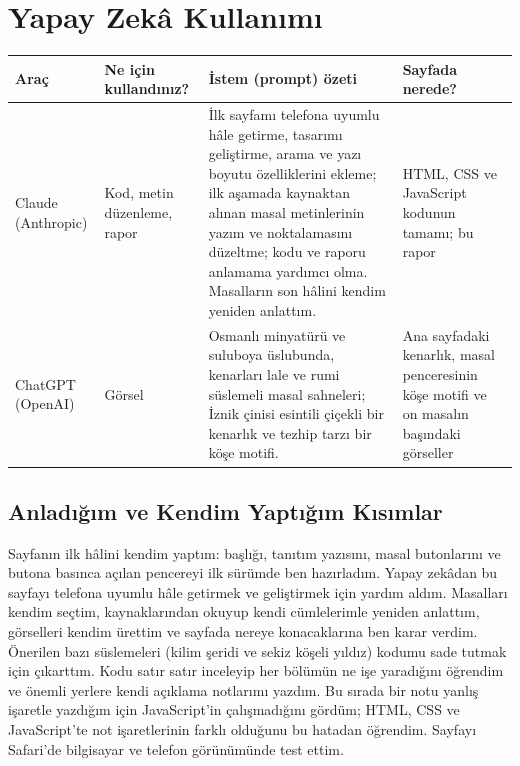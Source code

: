 \documentclass[12pt,a4paper]{article}
\begin{document}
\section{Yapay Zekâ Kullanımı}

\begin{longtable}{@{}p{2.6cm}p{3.6cm}p{4.2cm}p{3.4cm}@{}}
\toprule
\textbf{Araç} & \textbf{Ne için kullandınız?} & \textbf{İstem (prompt) özeti} & \textbf{Sayfada nerede?} \\
\midrule
\endhead
Claude (Anthropic) & Kod, metin düzenleme, rapor & İlk sayfamı telefona uyumlu hâle getirme, tasarımı geliştirme, arama ve yazı boyutu özelliklerini ekleme; ilk aşamada kaynaktan alınan masal metinlerinin yazım ve noktalamasını düzeltme; kodu ve raporu anlamama yardımcı olma. Masalların son hâlini kendim yeniden anlattım. & HTML, CSS ve JavaScript kodunun tamamı; bu rapor \\
\relax ChatGPT (OpenAI) & Görsel & Osmanlı minyatürü ve suluboya üslubunda, kenarları lale ve rumi süslemeli masal sahneleri; İznik çinisi esintili çiçekli bir kenarlık ve tezhip tarzı bir köşe motifi. & Ana sayfadaki kenarlık, masal penceresinin köşe motifi ve on masalın başındaki görseller \\
\bottomrule
\end{longtable}

\subsection{Anladığım ve Kendim Yaptığım Kısımlar}
Sayfanın ilk hâlini kendim yaptım: başlığı, tanıtım yazısını, masal butonlarını ve butona basınca açılan pencereyi ilk sürümde ben hazırladım. Yapay zekâdan bu sayfayı telefona uyumlu hâle getirmek ve geliştirmek için yardım aldım. Masalları kendim seçtim, kaynaklarından okuyup kendi cümlelerimle yeniden anlattım, görselleri kendim ürettim ve sayfada nereye konacaklarına ben karar verdim. Önerilen bazı süslemeleri (kilim şeridi ve sekiz köşeli yıldız) kodumu sade tutmak için çıkarttım. Kodu satır satır inceleyip her bölümün ne işe yaradığını öğrendim ve önemli yerlere kendi açıklama notlarımı yazdım. Bu sırada bir notu yanlış işaretle yazdığım için JavaScript'in çalışmadığını gördüm; HTML, CSS ve JavaScript'te not işaretlerinin farklı olduğunu bu hatadan öğrendim. Sayfayı Safari'de bilgisayar ve telefon görünümünde test ettim.
\end{document}
